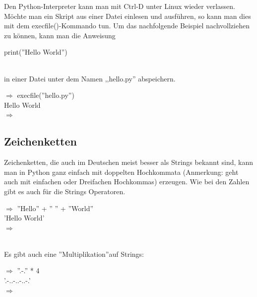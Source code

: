 Den Python-Interpreter kann man mit Ctrl-D unter Linux wieder verlassen.
\\
Möchte man ein Skript aus einer Datei einlesen und ausführen, so kann man dies mit dem execfile()-Kommando tun. Um das nachfolgende Beispiel nachvollziehen zu können, kann man die Anweisung
\\
\begin{MyConsoleBox}{%
  print(''Hello World'') \\
}\end{MyConsoleBox}
\\
in einer Datei unter dem Namen ,,hello.py'' abspeichern.
\\
\begin{MyConsoleBox}{
  ${\Longrightarrow}$ execfile(''hello.py'') \\
  Hello World \\
  ${\Longrightarrow}$ \\
}\end{MyConsoleBox}

\subsection{Zeichenketten}
Zeichenketten, die auch im Deutschen meist besser als Strings bekannt sind, kann man in Python ganz einfach mit doppelten Hochkommata (Anmerkung: geht auch mit einfachen oder Dreifachen Hochkommas) erzeugen. Wie bei den Zahlen gibt es auch für die Strings Operatoren.
\\
\begin{MyConsoleBox}{
  ${\Longrightarrow}$ ''Hello'' + '' '' + ''World'' \\
  'Hello World' \\
  ${\Longrightarrow}$ \\
}\end{MyConsoleBox}
\\
Es gibt auch eine ''Multiplikation''auf Strings:
\\
\begin{MyConsoleBox}{
  ${\Longrightarrow}$ ''.-.'' * 4 \\
  '.-..-..-..-.' \\
  ${\Longrightarrow}$ \\
}\end{MyConsoleBox}
\\

